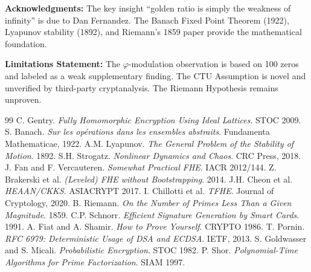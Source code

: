 \documentclass{article}
\begin{document}
\textbf{Acknowledgments:} The key insight ``golden ratio is simply the weakness of infinity'' is due to Dan Fernandez. The Banach Fixed Point Theorem (1922), Lyapunov stability (1892), and Riemann's 1859 paper provide the mathematical foundation.

\textbf{Limitations Statement:} The $\varphi$-modulation observation is based on 100 zeros and labeled as a weak supplementary finding. The CTU Assumption is novel and unverified by third-party cryptanalysis. The Riemann Hypothesis remains unproven.

\begin{thebibliography}{99}
 C. Gentry. \textit{Fully Homomorphic Encryption Using Ideal Lattices}. STOC 2009.
 S. Banach. \textit{Sur les op\'erations dans les ensembles abstraits}. Fundamenta Mathematicae, 1922.
 A.M. Lyapunov. \textit{The General Problem of the Stability of Motion}. 1892.
 S.H. Strogatz. \textit{Nonlinear Dynamics and Chaos}. CRC Press, 2018.
 J. Fan and F. Vercauteren. \textit{Somewhat Practical FHE}. IACR 2012/144.
 Z. Brakerski et al. \textit{(Leveled) FHE without Bootstrapping}. 2014.
 J.H. Cheon et al. \textit{HEAAN/CKKS}. ASIACRYPT 2017.
 I. Chillotti et al. \textit{TFHE}. Journal of Cryptology, 2020.
 B. Riemann. \textit{On the Number of Primes Less Than a Given Magnitude}. 1859.
 C.P. Schnorr. \textit{Efficient Signature Generation by Smart Cards}. 1991.
 A. Fiat and A. Shamir. \textit{How to Prove Yourself}. CRYPTO 1986.
 T. Pornin. \textit{RFC 6979: Deterministic Usage of DSA and ECDSA}. IETF, 2013.
 S. Goldwasser and S. Micali. \textit{Probabilistic Encryption}. STOC 1982.
 P. Shor. \textit{Polynomial-Time Algorithms for Prime Factorization}. SIAM 1997.
\end{thebibliography}
\end{document}
